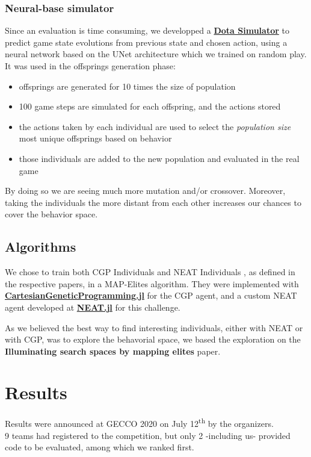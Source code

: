 \subsubsection{Neural-base simulator}
Since an evaluation is time consuming, we developped a \href{https://github.com/TemplierPaul/Dota_Simulator}{\textbf{Dota Simulator}} to predict game state evolutions from previous state and chosen action, using a neural network based on the UNet \cite{UNet} architecture which we trained on random play. It was used in the offsprings generation phase:
\begin{itemize}
    \item offsprings are generated for 10 times the size of population 
    \item 100 game steps are simulated for each offspring, and the actions stored
    \item the actions taken by each individual are used to select the \textit{population size} most unique offsprings based on behavior
    \item those individuals are added to the new population and evaluated in the real game
\end{itemize}
By doing so we are seeing much more mutation and/or crossover. Moreover, taking the individuals the more distant from each other increases our chances to cover the behavior space.

\subsection{Algorithms}
We chose to train both CGP Individuals  \cite{CGP} and NEAT Individuals \cite{NEAT_1}, as defined in the respective papers, in a MAP-Elites algorithm. They were implemented with \href{https://github.com/d9w/CartesianGeneticProgramming.jl}{\textbf{CartesianGeneticProgramming.jl}} for the CGP agent, and a custom NEAT agent developed at \href{https://github.com/d9w/NEAT.jl}{\textbf{NEAT.jl}} for this challenge.

As we believed the best way to find interesting individuals, either with NEAT or with CGP, was to explore the behavorial space, we based the exploration on the \textbf{Illuminating search spaces by mapping elites} \cite{MapElites} paper. 

\section{Results}

Results were announced at GECCO 2020 on July 12\textsuperscript{th} by the organizers. \\
9 teams had registered to the competition, but only 2 -including us- provided code to be evaluated, among which we ranked first. \\

